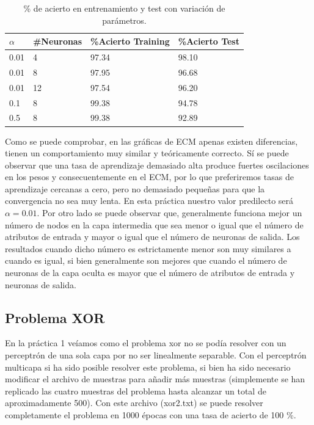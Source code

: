 \documentclass[spanish]{assignment}
\begin{document}
	\begin{table}[ht!]
		\centering
		\begin{tabular}{|l|l|l|l|}
			\hline
			\textbf{$\alpha$} & \textbf{\#Neuronas} & \textbf{ \%Acierto Training} & \textbf{\%Acierto Test} \\ \hline
			0.01& 4 & 97.34 & 98.10 \\ \hline
			0.01& 8 & 97.95 & 96.68 \\ \hline
			0.01& 12 & 97.54 & 96.20 \\ \hline
			0.1& 8 & 99.38 & 94.78 \\ \hline
			0.5& 8 & 99.38 & 92.89 \\ \hline
		\end{tabular}
		\caption{\% de acierto en entrenamiento y test con variación de parámetros.}
		\label{tab:pr1chart}
	\end{table}
	
	Como se puede comprobar, en las gráficas de ECM apenas existen diferencias, tienen un comportamiento muy similar y teóricamente correcto. Sí se puede observar que una tasa de aprendizaje demasiado alta produce fuertes oscilaciones en los pesos y consecuentemente en el ECM, por lo que preferiremos tasas de aprendizaje cercanas a cero, pero no demasiado pequeñas para que la convergencia no sea muy lenta. En esta práctica nuestro valor predilecto será $\alpha = 0.01$. Por otro lado se puede observar que, generalmente funciona mejor un número de nodos en la capa intermedia que sea menor o igual que el número de atributos de entrada y mayor o igual que el número de neuronas de salida. Los resultados cuando dicho número es estrictamente menor son muy similares a cuando es igual, si bien generalmente son mejores que cuando el número de neuronas de la capa oculta es mayor que el número de atributos de entrada y neuronas de salida.
	
	\subsection{Problema XOR}
	En la práctica 1 veíamos como el problema xor no se podía resolver con un perceptrón de una sola capa por no ser linealmente separable. Con el perceptrón multicapa si ha sido posible resolver este problema, si bien ha sido necesario modificar el archivo de muestras para añadir más muestras (simplemente se han replicado las cuatro muestras del problema hasta alcanzar un total de aproximadamente 500). Con este archivo (xor2.txt) se puede resolver completamente el problema en 1000 épocas con una tasa de acierto de 100 \%.
	
\end{document}
